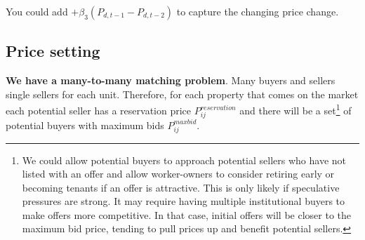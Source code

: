 You could add $+ \beta_3 (P_{d,t-1}-P_{d,t-2})$ to capture the changing  price change. 










\subsection{Price setting}
\textbf{We have a many-to-many matching problem}. Many buyers and sellers single sellers for each unit. Therefore, for each property that comes on the market each potential seller has a reservation price $P_{ij}^{reservation}$ and there will be a set\footnote{We could allow potential buyers  to approach potential sellers who have not listed with an offer and allow worker-owners to consider retiring early or becoming tenants if an offer is attractive.  This is only likely if speculative pressures are strong. It may require having multiple institutional buyers to make offers more competitive. In that case, initial offers will be closer to the maximum bid price, tending to pull prices up and benefit potential sellers.}  of potential buyers with maximum bids $P_{ij}^{maxbid}$.


